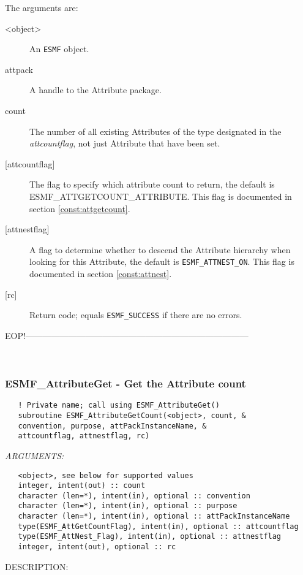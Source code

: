    The arguments are:
   \begin{description}
   \item [<object>]
   An {\tt ESMF} object.
   \item [attpack]
   A handle to the Attribute package.
   \item [count]
   The number of all existing Attributes of the type designated in the
   {\it attcountflag}, not just Attribute that have been set.
   \item [{[attcountflag]}]
   The flag to specify which attribute count to return, the
   default is ESMF\_ATTGETCOUNT\_ATTRIBUTE. This flag is documented
   in section \ref{const:attgetcount}.
   \item [{[attnestflag]}]
   A flag to determine whether to descend the
   Attribute hierarchy when looking for this Attribute, the default
   is {\tt ESMF\_ATTNEST\_ON}. This flag is documented in section
   \ref{const:attnest}.
   \item [{[rc]}]
   Return code; equals {\tt ESMF\_SUCCESS} if there are no errors.
   \end{description}
  
  EOP!------------------------------------------------------------------------------ 
 
\mbox{}\hrulefill\ 
 
\subsubsection [ESMF\_AttributeGet] {ESMF\_AttributeGet - Get the Attribute count}


  
\begin{verbatim}   ! Private name; call using ESMF_AttributeGet()
   subroutine ESMF_AttributeGetCount(<object>, count, &
   convention, purpose, attPackInstanceName, &
   attcountflag, attnestflag, rc)\end{verbatim}{\em ARGUMENTS:}
\begin{verbatim}   <object>, see below for supported values
   integer, intent(out) :: count
   character (len=*), intent(in), optional :: convention
   character (len=*), intent(in), optional :: purpose
   character (len=*), intent(in), optional :: attPackInstanceName
   type(ESMF_AttGetCountFlag), intent(in), optional :: attcountflag
   type(ESMF_AttNest_Flag), intent(in), optional :: attnestflag
   integer, intent(out), optional :: rc\end{verbatim}
{\sf DESCRIPTION:\\ }


